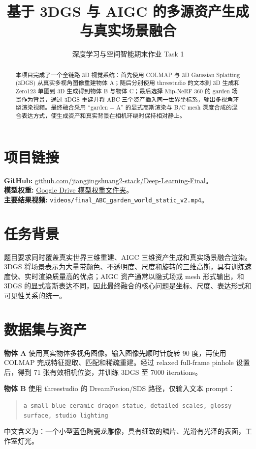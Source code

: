 \documentclass[11pt]{article}
\title{基于 3DGS 与 AIGC 的多源资产生成与真实场景融合}
\author{深度学习与空间智能期末作业 Task 1}
\date{}
\begin{document}
\maketitle

\begin{abstract}
本项目完成了一个全链路 3D 视觉系统：首先使用 COLMAP 与 3D Gaussian Splatting (3DGS) 从真实多视角图像重建物体 A；随后分别使用 threestudio 的文本到 3D 生成和 Zero123 单图到 3D 生成得到物体 B 与物体 C；最后选择 Mip-NeRF 360 的 garden 场景作为背景，通过 3DGS 重建并将 ABC 三个资产插入同一世界坐标系，输出多视角环绕渲染视频。最终融合采用 ``garden + A'' 的显式高斯渲染与 B/C mesh 深度合成的混合表达方式，使生成资产和真实背景在相机环绕时保持相对静止。
\end{abstract}

\section{项目链接}
\textbf{GitHub:} \href{https://github.com/jiangjingshuang2-stack/Deep-Learning-Final}{github.com/jiangjingshuang2-stack/Deep-Learning-Final}。\\
\textbf{模型权重:} \href{https://drive.google.com/drive/folders/154-pIcfsTkYXpTeUgTcfOjBJ5Sep0xIy?dmr=1&ec=wgc-drive-%5Bmodule%5D-goto}{Google Drive 模型权重文件夹}。\\
\textbf{主要结果视频:} \texttt{videos/final\_ABC\_garden\_world\_static\_v2.mp4}。

\section{任务背景}
题目要求同时覆盖真实世界三维重建、AIGC 三维资产生成和真实场景融合渲染。3DGS 将场景表示为大量带颜色、不透明度、尺度和旋转的三维高斯，具有训练速度快、实时渲染质量高的优点；AIGC 资产通常以隐式场或 mesh 形式输出，和 3DGS 的显式高斯表达不同，因此最终融合的核心问题是坐标、尺度、表达形式和可见性关系的统一。

\section{数据集与资产}
\textbf{物体 A} 使用真实物体多视角图像。输入图像先顺时针旋转 90 度，再使用 COLMAP 完成特征提取、匹配和稀疏重建。经过 relaxed full-frame pinhole 设置后，得到 71 张有效相机位姿，并训练 3DGS 至 7000 iterations。

\textbf{物体 B} 使用 threestudio 的 DreamFusion/SDS 路径，仅输入文本 prompt：
\begin{quote}
\texttt{a small blue ceramic dragon statue, detailed scales, glossy surface, studio lighting}
\end{quote}
中文含义为：一个小型蓝色陶瓷龙雕像，具有细致的鳞片、光滑有光泽的表面，工作室灯光。
\end{document}
